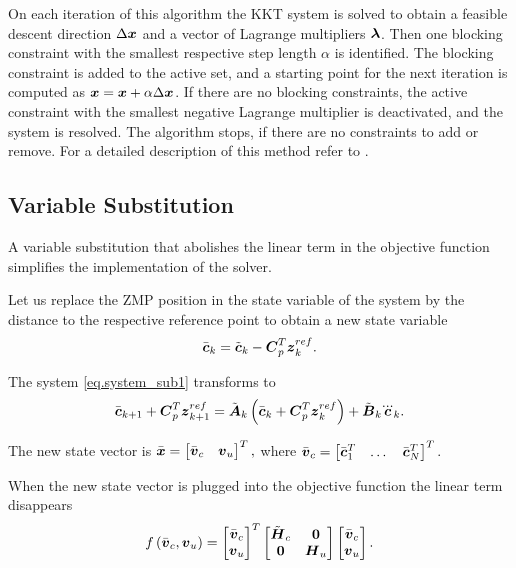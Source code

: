 On each iteration of this algorithm the \ac{KKT} system is solved to obtain a 
feasible descent direction $\Delta \mbox{\boldmath $x$}$ and a vector of Lagrange multipliers 
$\mbox{\boldmath $\lambda$}$. Then one blocking constraint with the smallest respective step 
length $\alpha$ is identified. The blocking constraint is added to the active set, 
and a starting point for the next iteration is computed as $\mbox{\boldmath $x$} = \mbox{\boldmath $x$} + 
\alpha \Delta \mbox{\boldmath $x$}$. If there are no blocking constraints, the active constraint 
with the smallest negative Lagrange multiplier is deactivated, and the system is 
resolved. The algorithm stops, if there are no constraints to add or remove.
For a detailed description of this method refer to \cite{NocedalNumOpt}. 


\subsection{Variable Substitution}
A variable substitution that abolishes the linear term in the objective
function simplifies the implementation of the solver.

Let us replace the \ac{ZMP} position in the state variable of the system by the 
distance to the respective reference point to obtain a new state variable
\begin{equation}\label{eq.substitution2}
\bar{\mbm{c}}_{k} = \tilde{\mbm{c}}_{k} - \mbm{C}_p^T \mbm{z}^{ref}_k.
\end{equation}

The system \cref{eq.system_sub1} transforms to
\begin{equation}\label{eq.system_sub2}
\bar{\mbm{c}}_{k+1} + \mbm{C}_p^T \mbm{z}^{ref}_{k+1}
= \tilde{\mbm{A}}_k \left(\bar{\mbm{c}}_{k} + \mbm{C}_p^T \mbm{z}^{ref}_k\right)
+ \tilde{\mbm{B}}_k \dddot{\mbm{c}}_{k}.
\end{equation}

The new state vector is
$\bar{\mbox{\boldmath $x$}} = \begin{bmatrix} \bar{\mbox{\boldmath $v$}}_c & \mbox{\boldmath $v$}_u \end{bmatrix}^T,$
where
$
\bar{\mbox{\boldmath $v$}}_c = \begin{bmatrix} \bar{\mbox{\boldmath $c$}}^T_1 & \dots & \bar{\mbox{\boldmath $c$}}^T_N \end{bmatrix}^T.
$

When the new state vector is plugged into the objective function the linear term 
disappears
$$
f\left(\bar{\mbox{\boldmath $v$}}_c, \mbox{\boldmath $v$}_u\right) =
\begin{bmatrix} \bar{\mbox{\boldmath $v$}}_c \\ \mbox{\boldmath $v$}_u \end{bmatrix}^T
\begin{bmatrix} 
    \tilde{\mbox{\boldmath $H$}}_c   & \mbox{\boldmath $0$} \\ 
    \mbox{\boldmath $0$}             & \mbox{\boldmath $H$}_u \\
\end{bmatrix}
\begin{bmatrix} \bar{\mbox{\boldmath $v$}}_c \\ \mbox{\boldmath $v$}_u \end{bmatrix}.
$$

